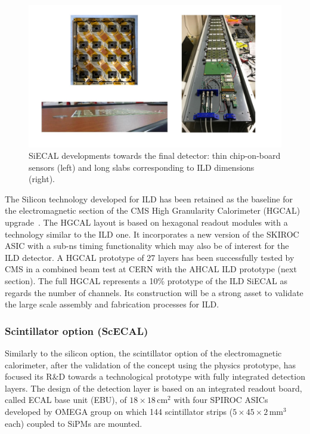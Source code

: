 \begin{figure}[t!]
\centering
\includegraphics[width=1.0\hsize]{Detector/fig/SiWECAL_dev.jpg}
\caption{SiECAL developments towards the final detector: thin chip-on-board sensors (left) and long slabs corresponding to ILD dimensions (right).}
\label{fig:det:SiWECAL_dev}
\end{figure}

The Silicon technology developed for ILD has been retained as the baseline for the electromagnetic section of the CMS High Granularity Calorimeter (HGCAL) upgrade~\cite{Collaboration:2293646}. The HGCAL layout is based on hexagonal readout modules with a technology similar to the ILD one. It incorporates a new version of the SKIROC ASIC with a sub-ns timing functionality which may also be of interest for the ILD detector. A HGCAL prototype of 27 layers has been successfully tested by CMS in a combined beam test at CERN with the AHCAL ILD prototype (next section). The full HGCAL represents a 10\% prototype of the ILD SiECAL as regards the number of channels. Its construction will be a strong asset to validate the large scale assembly and fabrication processes for ILD. 


\subsubsection{Scintillator option (ScECAL)}

Similarly to the silicon option, the scintillator option of the electromagnetic calorimeter,
after the validation of the concept using the physics prototype,
has focused its R\&D towards a technological prototype 
with fully integrated detection layers. 
The design of the detection layer is based on an integrated readout board, 
called ECAL base unit (EBU), of $18\times18\,\mathrm{cm}^2$ 
with four SPIROC ASICs developed by OMEGA group\cite{ild:bib:spiroc} on which 144 scintillator strips 
($5\times45\times2\,\mathrm{mm^3}$ each) coupled to SiPMs are mounted.

